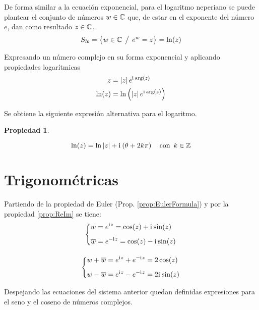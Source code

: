 \documentclass[a5paper,12pt,twoside]{book}
\newtheorem{prop}{{Propiedad}}[chapter]
\begin{document}
De forma similar a la ecuación exponencial, para el logaritmo neperiano se puede plantear el conjunto de números $w \in \mathbb{C}$ que, de estar en el exponente del número $e$, dan como resultado $z \in \mathbb{C}$.
\begin{equation*}
    {{S}_\textsl{{ln}}} = { \left\{ {w \in \mathbb{C} \hspace{1ex} \big/ \hspace{1ex} e^w = z} \right\} } = \ln(z)
\end{equation*}

Expresando un número complejo en su forma exponencial y aplicando propiedades logarítmicas
\begin{align*}
    z &= {\left| {z} \right|} \, e^{\mathrm{i}\mkern1mu \arg(z)}
    \\
    \ln (z) &= \ln \left( {\left| {z} \right|} \, e^{\mathrm{i}\mkern1mu \arg(z)} \right)
\end{align*}

Se obtiene la siguiente expresión alternativa para el logaritmo.

\begin{mdframed}[style=MyFrame1]
    \begin{prop}
    \end{prop}
    \begin{equation*}
        \ln(z) = \ln {\left| {z} \right|} + \mathrm{i}\mkern1mu \left( \theta + 2 k\pi \right) \quad \textrm{con} \enspace k \in \mathbb{Z}
    \end{equation*}
\end{mdframed}


\section{Trigonométricas}

Partiendo de la propiedad de Euler (Prop. \ref{prop:EulerFormula}) y por la propiedad \ref{prop:ReIm} se tiene:
\begin{gather*}
    \left\{
    \begin{aligned}
        w &= e^{\mathrm{i}\mkern1mu z} = \cos(z) + \mathrm{i}\mkern1mu \sin(z)
        \\[1ex]
        \overline{w} &= e^{-\mathrm{i}\mkern1mu z} = \cos(z) - \mathrm{i}\mkern1mu \sin(z)
    \end{aligned}
    \right.
    \\[1em]
    \left\{
    \begin{aligned}
        w + \overline{w} &= e^{\mathrm{i}\mkern1mu z} + e^{-\mathrm{i}\mkern1mu z} = 2 \cos(z)
        \\[1ex]
        w - \overline{w} &= e^{\mathrm{i}\mkern1mu z} - e^{-\mathrm{i}\mkern1mu z} = 2 \mathrm{i}\mkern1mu \sin(z)
    \end{aligned}
    \right.
\end{gather*}

Despejando las ecuaciones del sistema anterior quedan definidas expresiones para el seno y el coseno de números complejos.
\end{document}
